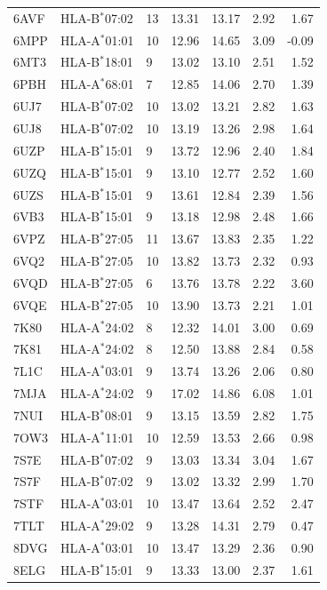 \begin{longtable}{lllrrrr}
6AVF & HLA-B$^{*}$07:02 & 13 & 13.31 & 13.17 & 2.92 & 1.67\\
6MPP & HLA-A$^{*}$01:01 & 10 & 12.96 & 14.65 & 3.09 & -0.09\\
6MT3 & HLA-B$^{*}$18:01 & 9 & 13.02 & 13.10 & 2.51 & 1.52\\
6PBH & HLA-A$^{*}$68:01 & 7 & 12.85 & 14.06 & 2.70 & 1.39\\
6UJ7 & HLA-B$^{*}$07:02 & 10 & 13.02 & 13.21 & 2.82 & 1.63\\
6UJ8 & HLA-B$^{*}$07:02 & 10 & 13.19 & 13.26 & 2.98 & 1.64\\
6UZP & HLA-B$^{*}$15:01 & 9 & 13.72 & 12.96 & 2.40 & 1.84\\
6UZQ & HLA-B$^{*}$15:01 & 9 & 13.10 & 12.77 & 2.52 & 1.60\\
6UZS & HLA-B$^{*}$15:01 & 9 & 13.61 & 12.84 & 2.39 & 1.56\\
6VB3 & HLA-B$^{*}$15:01 & 9 & 13.18 & 12.98 & 2.48 & 1.66\\
6VPZ & HLA-B$^{*}$27:05 & 11 & 13.67 & 13.83 & 2.35 & 1.22\\
6VQ2 & HLA-B$^{*}$27:05 & 10 & 13.82 & 13.73 & 2.32 & 0.93\\
6VQD & HLA-B$^{*}$27:05 & 6 & 13.76 & 13.78 & 2.22 & 3.60\\
6VQE & HLA-B$^{*}$27:05 & 10 & 13.90 & 13.73 & 2.21 & 1.01\\
7K80 & HLA-A$^{*}$24:02 & 8 & 12.32 & 14.01 & 3.00 & 0.69\\
7K81 & HLA-A$^{*}$24:02 & 8 & 12.50 & 13.88 & 2.84 & 0.58\\
7L1C & HLA-A$^{*}$03:01 & 9 & 13.74 & 13.26 & 2.06 & 0.80\\
7MJA & HLA-A$^{*}$24:02 & 9 & 17.02 & 14.86 & 6.08 & 1.01\\
7NUI & HLA-B$^{*}$08:01 & 9 & 13.15 & 13.59 & 2.82 & 1.75\\
7OW3 & HLA-A$^{*}$11:01 & 10 & 12.59 & 13.53 & 2.66 & 0.98\\
7S7E & HLA-B$^{*}$07:02 & 9 & 13.03 & 13.34 & 3.04 & 1.67\\
7S7F & HLA-B$^{*}$07:02 & 9 & 13.02 & 13.32 & 2.99 & 1.70\\
7STF & HLA-A$^{*}$03:01 & 10 & 13.47 & 13.64 & 2.52 & 2.47\\
7TLT & HLA-A$^{*}$29:02 & 9 & 13.28 & 14.31 & 2.79 & 0.47\\
8DVG & HLA-A$^{*}$03:01 & 10 & 13.47 & 13.29 & 2.36 & 0.90\\
8ELG & HLA-B$^{*}$15:01 & 9 & 13.33 & 13.00 & 2.37 & 1.61\\

\end{longtable}
